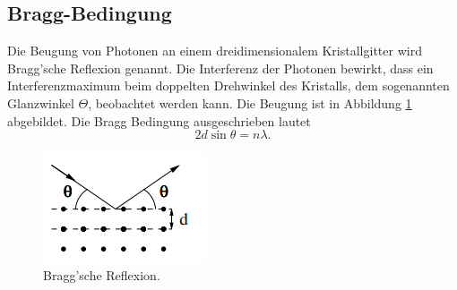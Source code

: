 \subsection{Bragg-Bedingung}
Die Beugung von Photonen an einem dreidimensionalem Kristallgitter wird Bragg'sche Reflexion genannt.
Die Interferenz der Photonen bewirkt, dass ein Interferenzmaximum beim doppelten Drehwinkel des Kristalls, dem sogenannten Glanzwinkel $\Theta$, beobachtet werden kann.
Die Beugung ist in Abbildung \ref{fig:Bragg} abgebildet.
Die Bragg Bedingung ausgeschrieben lautet
\begin{equation}
    2d \sin\theta=n\lambda.
    \label{eq:GlBragg}
\end{equation}
\begin{figure}[H]
    \centering
    \includegraphics[scale=1.5]{content/Bragg.png}
    \caption{Bragg'sche Reflexion\cite{sample}.}
    \label{fig:Bragg}
\end{figure}

\cite{sample}
